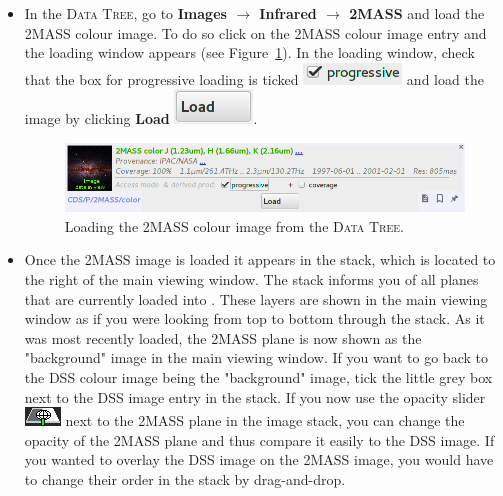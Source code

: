 \documentclass [a4paper, 12pt]{article}
\begin{document}
\begin{itemize}
    \item In the \textsc{Data Tree}, go to \textbf{Images $\rightarrow$
Infrared $\rightarrow$ 2MASS} and load the 2MASS colour image. To do so click on
the 2MASS colour image entry and the loading window appears (see
Figure~\ref{fig:aladin_load_2mass}). In the loading window, check that the box
for progressive loading is ticked \includegraphics[width=0.07
\textwidth]{../images/aladin_load_progessive.png} and load the image by
clicking \textbf{Load}  \includegraphics[width=0.07
\textwidth]{../images/aladin_load_load.png}.

\begin{figure}[H]
    \center
    \includegraphics[width=1
    \textwidth]{../images/aladin_load_2mass-rgb-image.png}
    \caption{Loading the 2MASS colour image from the \textsc{Data Tree}. }
    \label{fig:aladin_load_2mass}
\end{figure}

    \item Once the 2MASS image is loaded it appears in the stack, which is
    located to the right of the main viewing window. The stack informs you of
    all planes that are currently loaded into \aladin. These layers are shown
    in the main viewing window as if you were looking from top to bottom
    through the stack. As it was most recently loaded, the 2MASS plane is now shown
    as the "background" image in the main viewing window. If you want to go
    back to the DSS colour image being the "background" image, tick the little
    grey box next to the DSS image entry in the stack. If you now use the
    opacity slider \includegraphics[width=0.035
    \textwidth]{../images/aladin_button_opacity.png} next to the 2MASS plane in
    the image stack, you can change the opacity of the 2MASS plane and thus compare
    it easily to the DSS image. If you wanted to overlay the DSS image on the
    2MASS image, you would have to change their order in the stack by drag-and-drop.


\end{itemize}
\end{document}
